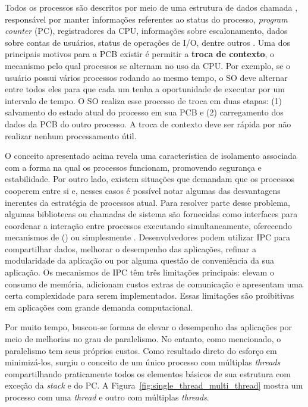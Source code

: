 Todos os processos são descritos por meio de uma estrutura de dados chamada
, responsável por manter informações
referentes ao status do processo, \emph{program counter} (PC), registradores da
CPU, informações sobre escalonamento, dados sobre contas de usuários, status de
operações de I/O, dentre outros \citep{silberschatz}.  Uma dos principais
motivos para a PCB existir é permitir a \textbf{troca de contexto}, o mecanismo
pelo qual processos se alternam no uso da CPU.  Por exemplo, se o usuário
possui vários processos rodando ao mesmo tempo, o SO deve alternar entre todos
eles para que cada um tenha a oportunidade de executar por um intervalo de
tempo. O SO realiza esse processo de troca em duas etapas: (1) salvamento do
estado atual do processo em sua PCB e (2) carregamento dos dados da PCB do
outro processo. A troca de contexto deve ser rápida por não realizar nenhum
processamento útil.

O conceito apresentado acima revela uma característica de isolamento associada
com a forma na qual os processos funcionam, promovendo segurança e
estabilidade.  Por outro lado, existem situações que demandam que os processos
cooperem entre si e, nesses casos é possível notar algumas das desvantagens
inerentes da estratégia de processos atual. Para resolver parte desse problema,
algumas bibliotecas ou chamadas de sistema são fornecidas como interfaces para
coordenar a interação entre processos executando simultaneamente, oferecendo
mecanismos de 
() ou simplesmente .
Desenvolvedores podem utilizar IPC para compartilhar dados, melhorar o
desempenho das aplicações, refinar a modularidade da aplicação ou por alguma
questão de conveniência da sua aplicação. Os mecanismos de IPC têm três
limitações principais: elevam o consumo de memória, adicionam custos extras de
comunicação e apresentam uma certa complexidade para serem implementados. Essas
limitações são proibitivas em aplicações com grande demanda computacional.

Por muito tempo, buscou-se formas de elevar o desempenho das
aplicações por meio de melhorias no grau de paralelismo. No entanto, como
mencionado, o paralelismo tem seus próprios custos. Como resultado direto
do esforço em minimizá-los,
surgiu o conceito de um único processo com múltiplas \emph{threads}
compartilhando praticamente todos os elementos básicos de sua estrutura com exceção da
\emph{stack} e do PC. A Figura~\ref{fig:single_thread_multi_thread} mostra um
processo com uma \emph{thread} e outro com múltiplas \emph{threads}.

